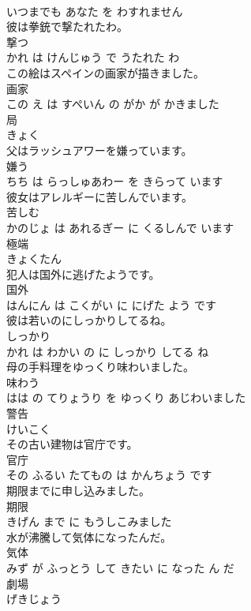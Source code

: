 \documentclass[8pt]{extreport}
\begin{document}
\begin{CJK}{UTF8}{min}
\\	いつまでも あなた を わすれません			
\\	彼は拳銃で撃たれたわ。	
\\	撃つ 
\\	かれ は けんじゅう で うたれた わ			
\\	この絵はスペインの画家が描きました。	
\\	画家 
\\	この え は すぺいん の がか が かきました			
\\	局	
\\	きょく		
\\	父はラッシュアワーを嫌っています。	
\\	嫌う 
\\	ちち は らっしゅあわー を きらって います			
\\	彼女はアレルギーに苦しんでいます。	
\\	苦しむ 
\\	かのじょ は あれるぎー に くるしんで います			
\\	極端	
\\	きょくたん		
\\	犯人は国外に逃げたようです。	
\\	国外 
\\	はんにん は こくがい に にげた よう です			
\\	彼は若いのにしっかりしてるね。	
\\	しっかり 
\\	かれ は わかい の に しっかり してる ね			
\\	母の手料理をゆっくり味わいました。	
\\	味わう 
\\	はは の てりょうり を ゆっくり あじわいました			
\\	警告	
\\	けいこく		
\\	その古い建物は官庁です。	
\\	官庁 
\\	その ふるい たてもの は かんちょう です			
\\	期限までに申し込みました。	
\\	期限 
\\	きげん まで に もうしこみました			
\\	水が沸騰して気体になったんだ。	
\\	気体 
\\	みず が ふっとう して きたい に なった ん だ			
\\	劇場	
\\	げきじょう		

\end{CJK}
\end{document}
